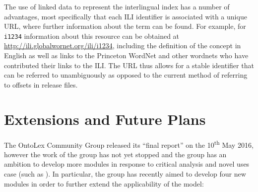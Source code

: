 \documentclass[12pt,a4paper]{elex2017}
\begin{document}
The use of linked data to represent the interlingual index has a number of
advantages, most specifically that each ILI identifier is associated with a
unique URL, where further information about the term can be found. For example,
for \texttt{i1234} information about this resource can be obtained at
\url{http://ili.globalwornet.org/ili/i1234}, including the definition of the
concept in English as well as links to the Princeton WordNet and other wordnets
who have contributed their links to the ILI. The URL thus allows for a stable
identifier that can be referred to unambiguously as opposed to the current
method of referring to offsets in release files.

\section{Extensions and Future Plans}

The OntoLex Community Group released its ``final report'' on the
10\textsuperscript{th} May 2016,
however the work of the group has not yet stopped and the group has an ambition
to develop more modules in response to critical analysis and novel uses case
(such as \cite{chavula2014lemon}). In particular, the group has recently aimed
to develop four new modules in order to further extend the applicability of the
model:
\end{document}
